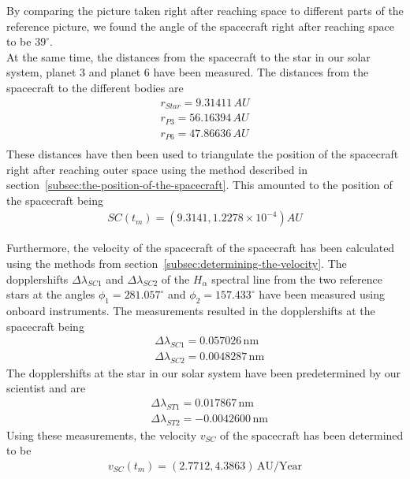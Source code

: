 \documentclass[reprint,english,notitlepage]{revtex4-2}
\begin{document}
By comparing the picture taken right after reaching space to different parts of the reference picture, we found the angle of the spacecraft right after reaching space to be $39^{\circ}$.\\

At the same time, the distances from the spacecraft to the star in our solar system, planet 3 and planet 6 have been measured.
The distances from the spacecraft to the different bodies are
\begin{align*}
    r_{Star} = 9.31411 \,AU\\
	r_{P3} = 56.16394 \,AU\\
	r_{P6} = 47.86636 \,AU\\
\end{align*}
These distances have then been used to triangulate the position of the spacecraft right after reaching outer space using the method described in section~\ref{subsec:the-position-of-the-spacecraft}.
This amounted to the position of the spacecraft being
\begin{align}
    SC(t_m) = (9.3141, 1.2278 \times 10^{-4}) AU \label{pos_results}
\end{align}

Furthermore, the velocity of the spacecraft of the spacecraft has been calculated using the methods from section~\ref{subsec:determining-the-velocity}.
The dopplershifts $\Delta\lambda_{SC1}$ and $\Delta\lambda_{SC2}$ of the $H_{\alpha}$ spectral line from the two reference stars at the angles $ \phi_1 = 281.057^{\circ}$ and $ \phi_2 = 157.433^{\circ}$ have been measured using onboard instruments.
The measurements resulted in the dopplershifts at the spacecraft being
\begin{align*}
	&\Delta\lambda_{SC1} = 0.057026 \,\text{nm}\\
	&\Delta\lambda_{SC2} = 0.0048287 \,\text{nm}
\end{align*}
The dopplershifts at the star in our solar system have been predetermined by our scientist and are
\begin{align*}
    &\Delta\lambda_{ST1} = 0.017867 \,\text{nm}\\
	&\Delta\lambda_{ST2} = -0.0042600 \,\text{nm}
\end{align*}
Using these measurements, the velocity $v_{SC}$ of the spacecraft has been determined to be
\begin{align}
    v_{SC}(t_m) = (2.7712, 4.3863) \,\text{AU/Year} \label{vel_results}
\end{align}
\end{document}
